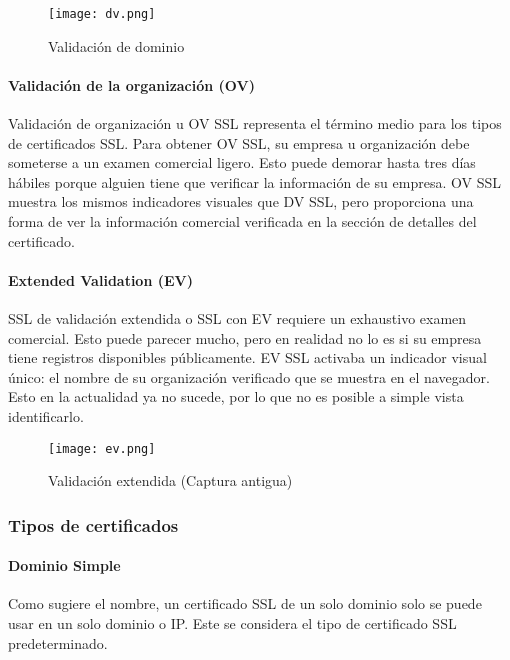 \begin{center}
   \begin{figure}   
      \begin{center}
         \texttt{[image: dv.png]}
      \end{center}
      \caption{Validación de dominio}
   \end{figure}
\end{center}

\paragraph*{Validación de la organización (OV)}
Validación de organización u OV SSL representa el término medio para los tipos de 
certificados SSL. Para obtener OV SSL, su empresa u organización debe someterse a 
un examen comercial ligero. Esto puede demorar hasta tres días hábiles porque alguien 
tiene que verificar la información de su empresa. OV SSL muestra los mismos indicadores 
visuales que DV SSL, pero proporciona una forma de ver la 
información comercial verificada en la sección de detalles del certificado. 

\paragraph*{Extended Validation (EV)}
SSL de validación extendida o SSL con EV requiere un exhaustivo examen comercial. 
Esto puede parecer mucho, pero en realidad no lo es si su empresa tiene 
registros disponibles públicamente. EV SSL activaba un indicador visual único: el 
nombre de su organización verificado que se muestra en el navegador. Esto en la 
actualidad ya no sucede, por lo que no es posible a simple vista identificarlo.

\begin{center}
   \begin{figure}   
      \begin{center}
         \texttt{[image: ev.png]}
      \end{center}
      \caption{Validación extendida (Captura antigua)}
   \end{figure}
\end{center}

  \subsubsection*{Tipos de certificados}

  \paragraph*{Dominio Simple}
  Como sugiere el nombre, un certificado SSL de un solo dominio solo 
  se puede usar en un solo dominio o IP. Este se considera el tipo de 
  certificado SSL predeterminado. 
  
